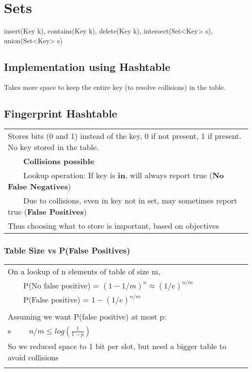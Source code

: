 \documentclass{article}
\newcommand{\tabitem}{~~\llap{\textbullet}~~}
\begin{document}
    \pagebreak

    \section{Sets}

    insert(Key k), contains(Key k), delete(Key k), intersect(Set<Key> s), union(Set<Key> s)

    \subsection{Implementation using Hashtable}

    Takes more space to keep the entire key (to resolve collisions) in the table.

    \subsection{Fingerprint Hashtable}

    \noindent\begin{tabular}{l}
        Stores bits (0 and 1) instead of the key, 0 if not present, 1 if present. No key stored in the table.\\
        \tabitem \textbf{Collisions possible}\\
        \tabitem Lookup operation: If key is \textbf{in}, will always report true (\textbf{No False Negatives})\\
        \tabitem Due to collisions, even in key not in set, may sometimes report true (\textbf{False Positives})\\
        Thus choosing what to store is important, based on objectives\\
    \end{tabular}

    \subsubsection{Table Size vs P(False Positives)}

    \begin{tabular}{l}
        On a lookup of n elements of table of size m,\\
        \tabitem P(No false positive) = $(1 - 1/m)^{n} \approx (1/e)^{n/m}$\\
        \tabitem P(False positive) = $1 - (1/e)^{n/m}$\\\\
        Assuming we want P(false positive) at most p:\\s
        \tabitem $n/m \leq log(\frac{1}{1-p})$\\
        So we reduced space to 1 bit per slot, but need a bigger table to avoid collisions\\\\
    \end{tabular}
    
\end{document}
